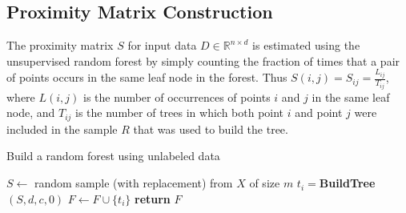 \subsection{Proximity Matrix Construction}\label{prox}
The proximity matrix $S$ for input data $D \in \mathbb{R}^{n \times d} $ is estimated using the unsupervised random forest by simply counting the fraction of times that a pair of points occurs in the same leaf node in the forest.
Thus $S(i,j) = S_{ij} = \frac{L_{ij}}{T_{ij}} $,
where $L(i,j)$ is the number of occurrences of points $i$ and $j$ in the
same leaf node,
and $T_{ij}$ is the number of trees in which both point $i$ and point $j$
were included in the sample $R$ that was used to build the tree.


 


\begin{algorithm}
\caption{Build a random forest using unlabeled data}\label{alg:buildRF}
\begin{algorithmic}[1]


	\State $S \gets $ random sample (with replacement) from $X$ of size $m$ 
	\State $t_i = $\textbf{BuildTree}$(S, d, c, 0)$
	\State $F \gets F \cup \lbrace t_i \rbrace$
	\State \textbf{return} $F$
\EndFor
\EndProcedure
\end{algorithmic}
\end{algorithm}




